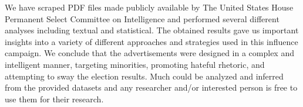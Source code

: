 \documentclass{article}
\begin{document}
We have scraped PDF files made publicly available by The United States House
Permanent Select Committee on Intelligence and performed several different
analyses including textual and statistical. The obtained results gave us
important insights into a variety of different approaches and strategies used
in this influence campaign. We conclude that the advertisements were designed
in a complex and intelligent manner, targeting minorities, promoting hateful
rhetoric, and attempting to sway the election results. Much could be analyzed
and inferred from the provided datasets and any researcher and/or interested
person is free to use them for their research.


\printbibliography

\end{document}
